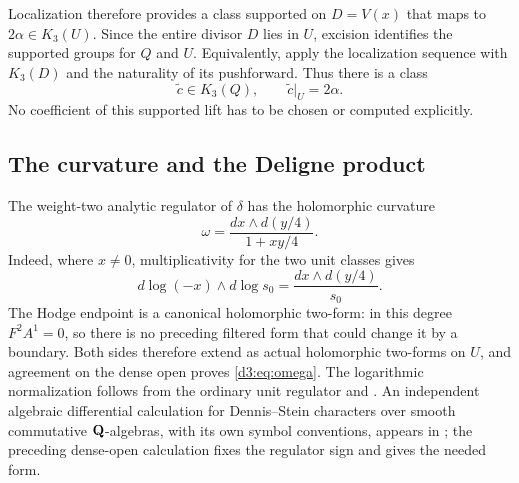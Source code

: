 Localization therefore provides a class supported on $D=V(x)$ that maps to $2\alpha\in K_3(U)$. Since the entire divisor $D$ lies in $U$, excision identifies the supported groups for $Q$ and $U$. Equivalently, apply the localization sequence with $K_3(D)$ and the naturality of its pushforward. Thus there is a class
\begin{equation}\label{d3:eq:explicitlift}
\widetilde c\in K_3(Q),\qquad \widetilde c|_U=2\alpha.
\end{equation}
No coefficient of this supported lift has to be chosen or computed explicitly.

\subsection{The curvature and the Deligne product}
The weight-two analytic regulator of $\delta$ has the holomorphic curvature
\begin{equation}\label{d3:eq:omega}
\omega=\frac{dx\wedge d(y/4)}{1+xy/4}.
\end{equation}
Indeed, where $x\neq0$, multiplicativity for the two unit classes gives
\[
d\log(-x)\wedge d\log s_0
=\frac{dx\wedge d(y/4)}{s_0}.
\]
The Hodge endpoint is a canonical holomorphic two-form: in this degree $F^2A^1=0$, so there is no preceding filtered form that could change it by a boundary. Both sides therefore extend as actual holomorphic two-forms on $U$, and agreement on the dense open proves \eqref{d3:eq:omega}. The logarithmic normalization follows from the ordinary unit regulator and \cite[Theorem~2.31 and Lemma~4.5]{BunkeTamme}. An independent algebraic differential calculation for Dennis--Stein characters over smooth commutative $\mathbf Q$-algebras, with its own symbol conventions, appears in \cite[Section~3.2, Theorem~3.4 and Corollary~3.6]{Ginot}; the preceding dense-open calculation fixes the regulator sign and gives the needed form.

